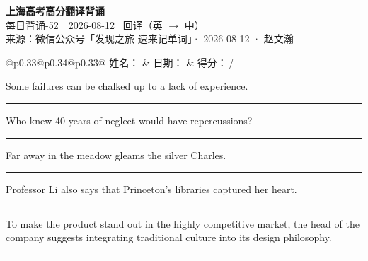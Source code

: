 \documentclass[11pt,a4paper]{article}
\newcommand{\num}[1]{\makebox[1.9em][r]{#1.}\hspace{0.3em}}
\newcommand{\wline}{\noindent\rule{\linewidth}{0.4pt}}
\begin{document}
\pagestyle{plain}
\begin{center}
{\LARGE\bfseries 上海高考高分翻译背诵 }\\[0.25em]
{\large 每日背诵-52　2026-08-12 \quad\ 回译（英 $\to$ 中）}\\[0.35em]
{\footnotesize 来源：微信公众号「发现之旅 速来记单词」· 2026-08-12 · 赵文瀚}
\end{center}

\vspace{0.4em}
\noindent\begin{tabular}{@{}p{0.33\textwidth}@{}p{0.34\textwidth}@{}p{0.33\textwidth}@{}}
姓名：\underline{\hspace{2.0cm}} & 日期：\underline{\hspace{2.0cm}} & 得分：\underline{\hspace{1.4cm}}\,/ \\
\end{tabular}

\vspace{0.5em}

\vspace{0.8em}
\num{1}Some failures can be chalked up to a lack of experience.

\vspace{0.25em}

\wline

\num{2}Who knew 40 years of neglect would have repercussions?

\vspace{0.25em}

\wline

\num{3}Far away in the meadow gleams the silver Charles.

\vspace{0.25em}

\wline

\num{4}Professor Li also says that Princeton's libraries captured her heart.

\vspace{0.25em}

\wline

\num{5}To make the product stand out in the highly competitive market, the head of the company suggests integrating traditional culture into its design philosophy.

\vspace{0.25em}

\wline
\end{document}
